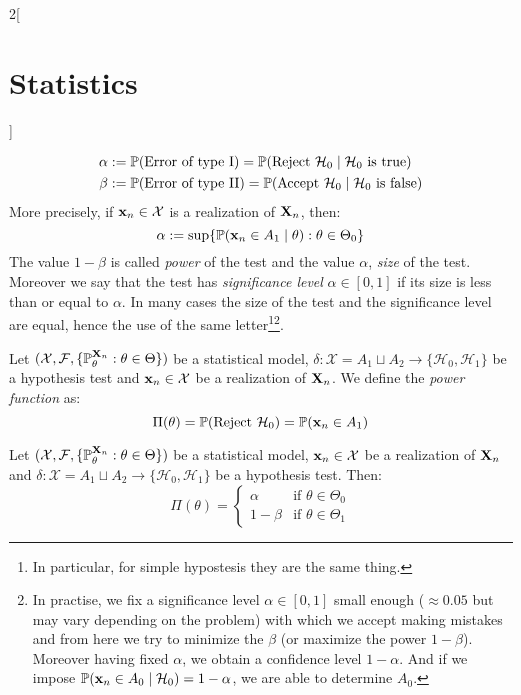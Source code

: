 \documentclass[../../../main_math.tex]{subfiles}
\begin{document}
\begin{multicols}{2}[\section{Statistics}]
\begin{definition}
    \begin{align*}
      \alpha & :=\mathbb{P}(\text{Error of type I})=\mathbb{P}(\text{Reject $\mathcal{H}_0$}\mid\text{$\mathcal{H}_0$ is true})   \\
      \beta  & :=\mathbb{P}(\text{Error of type II})=\mathbb{P}(\text{Accept $\mathcal{H}_0$}\mid\text{$\mathcal{H}_0$ is false})
    \end{align*}
    More precisely, if $\boldsymbol{\mathrm{x}}_n\in\mathcal{X}$ is a realization of $\boldsymbol{\mathrm{X}}_n$, then: $$\alpha:=\sup\{\mathbb{P}(\boldsymbol{\mathrm{x}}_n\in A_1\mid \theta):\theta\in\Theta_0\}$$
    The value $1-\beta$ is called \emph{power} of the test and the value $\alpha$, \emph{size} of the test. Moreover we say that the test has \emph{significance level} $\alpha\in[0,1]$ if its size is less than or equal to $\alpha$. In many cases the size of the test and the significance level are equal, hence the use of the same letter\footnote{In particular, for simple hypostesis they are the same thing.}\footnote{In practise, we fix a significance level $\alpha\in[0,1]$ small enough ($\approx 0.05$ but may vary depending on the problem) with which we accept making mistakes and from here we try to minimize the $\beta$ (or maximize the power $1-\beta$). Moreover having fixed $\alpha$, we obtain a confidence level $1-\alpha$. And if we impose $\mathbb{P}(\boldsymbol{\mathrm{x}}_n\in A_0\mid \mathcal{H}_0)=1-\alpha$, we are able to determine $A_0$.}.
  \end{definition}
  \begin{definition}
    Let $(\mathcal{X},\mathcal{F},\{\mathbb{P}_\theta^{\boldsymbol{\mathrm{X}}_n}:\theta\in\Theta\})$ be a statistical model, $\delta:\mathcal{X}=A_1\sqcup A_2\rightarrow\{\mathcal{H}_0,\mathcal{H}_1\}$ be a hypothesis test and $\boldsymbol{\mathrm{x}}_n\in\mathcal{X}$ be a realization of $\boldsymbol{\mathrm{X}}_n$. We define the \emph{power function} as: $$\Pi(\theta)=\mathbb{P}(\text{Reject $\mathcal{H}_0$})=\mathbb{P}(\boldsymbol{\mathrm{x}}_n\in A_1)$$
  \end{definition}
  \begin{proposition}
    Let $(\mathcal{X},\mathcal{F},\{\mathbb{P}_\theta^{\boldsymbol{\mathrm{X}}_n}:\theta\in\Theta\})$ be a statistical model, $\boldsymbol{\mathrm{x}}_n\in\mathcal{X}$ be a realization of $\boldsymbol{\mathrm{X}}_n$ and $\delta:\mathcal{X}=A_1\sqcup A_2\rightarrow\{\mathcal{H}_0,\mathcal{H}_1\}$ be a hypothesis test. Then:
    $$
      \Pi(\theta)=
      \begin{cases}
        \alpha  & \text{if }\theta\in\Theta_0 \\
        1-\beta & \text{if }\theta\in\Theta_1
      \end{cases}
    $$
  \end{proposition}

\end{multicols}
\end{document}
